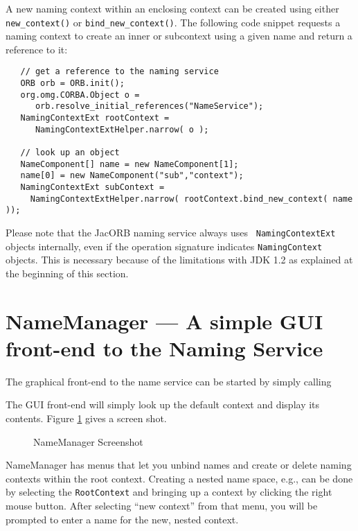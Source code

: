 \documentclass[12pt]{scrbook}
\begin{document}
A new naming context within  an enclosing context can be created using
either   {\tt  new\_context()}   or  {\tt   bind\_new\_context()}.  The
following code snippet requests a naming context to create an inner or
subcontext using a given name and return a reference to it:
\small{\begin{verbatim}
   // get a reference to the naming service
   ORB orb = ORB.init();
   org.omg.CORBA.Object o =
      orb.resolve_initial_references("NameService");
   NamingContextExt rootContext =
      NamingContextExtHelper.narrow( o );

   // look up an object
   NameComponent[] name = new NameComponent[1];
   name[0] = new NameComponent("sub","context");
   NamingContextExt subContext =
     NamingContextExtHelper.narrow( rootContext.bind_new_context( name ));
\end{verbatim}}

Please  note   that  the  JacORB  naming  service   always  uses  {\tt
NamingContextExt} objects internally,  even if the operation signature
indicates {\tt  NamingContext} objects.  This is  necessary because of
the limitations  with JDK  1.2 as explained  at the beginning  of this
section.

\section{NameManager --- A simple GUI front-end to the Naming Service}

The graphical front-end to the name service can be started by simply calling


The GUI front-end will simply look up the default context and display
its contents. Figure \ref{fig:nameManager} gives a screen shot.

\bigskip
\begin{figure}[htb]
\centerline{}
\caption{NameManager Screenshot}
\label{fig:nameManager}
\end{figure}

NameManager has menus  that let you unbind names  and create or delete
naming contexts within the root context. Creating a nested name space,
e.g., can be done by selecting the {\tt RootContext} and bringing up a
context  by clicking  the right  mouse button.  After  selecting ``new
context'' from that menu, you will be  prompted to enter a name for the
new, nested context.


\end{document}
